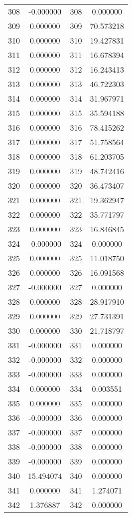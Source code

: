 \documentclass[12pt]{article}
\begin{document}
\begin{longtable}{@{}cccc@{}}
308 & -0.000000 & 308 & 0.000000 \\
309 & 0.000000 & 309 & 70.573218 \\
310 & 0.000000 & 310 & 19.427831 \\
311 & 0.000000 & 311 & 16.678394 \\
312 & 0.000000 & 312 & 16.243413 \\
313 & 0.000000 & 313 & 46.722303 \\
314 & 0.000000 & 314 & 31.967971 \\
315 & 0.000000 & 315 & 35.594188 \\
316 & 0.000000 & 316 & 78.415262 \\
317 & 0.000000 & 317 & 51.758564 \\
318 & 0.000000 & 318 & 61.203705 \\
319 & 0.000000 & 319 & 48.742416 \\
320 & 0.000000 & 320 & 36.473407 \\
321 & 0.000000 & 321 & 19.362947 \\
322 & 0.000000 & 322 & 35.771797 \\
323 & 0.000000 & 323 & 16.846845 \\
324 & -0.000000 & 324 & 0.000000 \\
325 & 0.000000 & 325 & 11.018750 \\
326 & 0.000000 & 326 & 16.091568 \\
327 & -0.000000 & 327 & 0.000000 \\
328 & 0.000000 & 328 & 28.917910 \\
329 & 0.000000 & 329 & 27.731391 \\
330 & 0.000000 & 330 & 21.718797 \\
331 & -0.000000 & 331 & 0.000000 \\
332 & -0.000000 & 332 & 0.000000 \\
333 & -0.000000 & 333 & 0.000000 \\
334 & 0.000000 & 334 & 0.003551 \\
335 & 0.000000 & 335 & 0.000000 \\
336 & -0.000000 & 336 & 0.000000 \\
337 & -0.000000 & 337 & 0.000000 \\
338 & -0.000000 & 338 & 0.000000 \\
339 & -0.000000 & 339 & 0.000000 \\
340 & 15.494074 & 340 & 0.000000 \\
341 & 0.000000 & 341 & 1.274071 \\
342 & 1.376887 & 342 & 0.000000 \\

\end{longtable}
\end{document}
